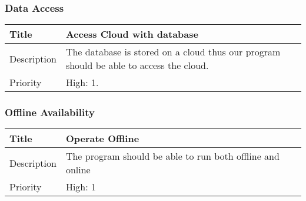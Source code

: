 \subsubsection{Data Access}
  \begin{table}[h!]
    \label{system-constraints/hardware/computation-table}
    \centering
    \begin{tabular}{|l|X|}
    \hline
      Title       & Access Cloud with database \\ \hline
      Description & The database is stored on a cloud thus our program
                    should be able to access the cloud. \\ \hline
      Priority    &   High: 1. \\ \hline
    \end{tabular}
  \end{table}

\subsubsection{Offline Availability}
  \begin{table}[h!]
    \centering
    \label{system-constraints/hardware/computation-table}
    \begin{tabular}{|l|X|}
    \hline
      Title       & Operate Offline \\ \hline
      Description & The program should be able to run both offline and online\\ \hline
      Priority    & High: 1 \\ \hline
    \end{tabular}
  \end{table}
